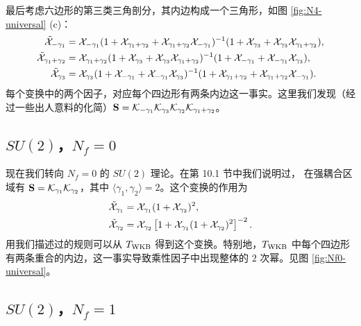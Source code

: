 最后考虑六边形的第三类三角剖分，其内边构成一个三角形，如图 \ref{fig:N4-universal} (c)：
\begin{align}
\tilde{\mathcal{X}}_{-\gamma_1}&=\mathcal{X}_{-\gamma_1}(1+\mathcal{X}_{\gamma_1+\gamma_2}+\mathcal{X}_{\gamma_1+\gamma_2}\mathcal{X}_{-\gamma_1})^{-1}(1+\mathcal{X}_{\gamma_3}+\mathcal{X}_{\gamma_3}\mathcal{X}_{\gamma_1+\gamma_2}),\\
\tilde{\mathcal{X}}_{\gamma_1+\gamma_2}&=\mathcal{X}_{\gamma_1+\gamma_2}(1+\mathcal{X}_{\gamma_3}+\mathcal{X}_{\gamma_3}\mathcal{X}_{\gamma_1+\gamma_2})^{-1}(1+\mathcal{X}_{-\gamma_1}+\mathcal{X}_{-\gamma_1}\mathcal{X}_{\gamma_3}),\\
\tilde{\mathcal{X}}_{\gamma_3}&=\mathcal{X}_{\gamma_3}(1+\mathcal{X}_{-\gamma_1}+\mathcal{X}_{-\gamma_1}\mathcal{X}_{\gamma_3})^{-1}(1+\mathcal{X}_{\gamma_1+\gamma_2}+\mathcal{X}_{\gamma_1+\gamma_2}\mathcal{X}_{-\gamma_1}).
\end{align}
每个变换中的两个因子，对应每个四边形有两条内边这一事实。这里我们发现（经过一些出人意料的化简）$\mathbf S=\mathcal{K}_{-\gamma_1}\mathcal{K}_{\gamma_3}\mathcal{K}_{\gamma_2}\mathcal{K}_{\gamma_1+\gamma_2}$。


\subsection{$SU(2)$，$N_f=0$}

现在我们转向 $N_f=0$ 的 $SU(2)$ 理论。在第 10.1 节中我们说明过，%
在强耦合区域有 $\mathbf S=\mathcal{K}_{\gamma_1}\mathcal{K}_{\gamma_2}$，其中 $\langle\gamma_1,\gamma_2\rangle=2$。这个变换的作用为
\begin{align}
\tilde{\mathcal{X}}_{\gamma_1}&=\mathcal{X}_{\gamma_1}(1+\mathcal{X}_{\gamma_2})^2,\\
\tilde{\mathcal{X}}_{\gamma_2}&=\mathcal{X}_{\gamma_2}\left[1+\mathcal{X}_{\gamma_1}(1+\mathcal{X}_{\gamma_2})^2\right]^{-2}.
\end{align}
用我们描述过的规则可以从 $T_{\rm WKB}$ 得到这个变换。特别地，$T_{\rm WKB}$ 中每个四边形有两条重合的内边，这一事实导致乘性因子中出现整体的 $2$ 次幂。见图 \ref{fig:Nf0-universal}。


\subsection{$SU(2)$，$N_f=1$}

